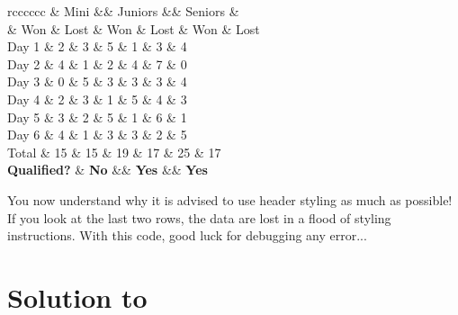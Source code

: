 \begin{Code}
\begin{tblr}{rcccccc}
& \SetCell[c=2]{} Mini && \SetCell[c=2]{}Juniors && \SetCell[c=2]{} Seniors &\\ 
&  Won &  Lost &   Won &  Lost &   Won &  Lost \\ \hline
Day 1 & 2 & 3 & 5 & 1 & 3 & 4 \\
 Day 2 & 4 & 1 & 2 & 4 & 7 & 0 \\
Day 3 & 0 & 5 & 3 & 3 & 3 & 4 \\
 Day 4 & 2 & 3 & 1 & 5 & 4 & 3 \\
Day 5 & 3 & 2 & 5 & 1 & 6 & 1 \\
 Day 6 & 4 & 1 & 3 & 3 & 2 & 5 \\ \hline[2pt]
Total &  15 &  15 &  19 &  17 &  25 &  17 \\
\textbf{Qualified?} &  \textbf{No} && \textbf{Yes} &&  \textbf{Yes}\\
\end{tblr}
\end{Code}

You now understand why it is advised to use header styling as much as possible! If you look at the last two rows, the data are lost in a flood of styling instructions. With this code, good luck for debugging any error...

\section{Solution to }\label{app:libraries_solution}

